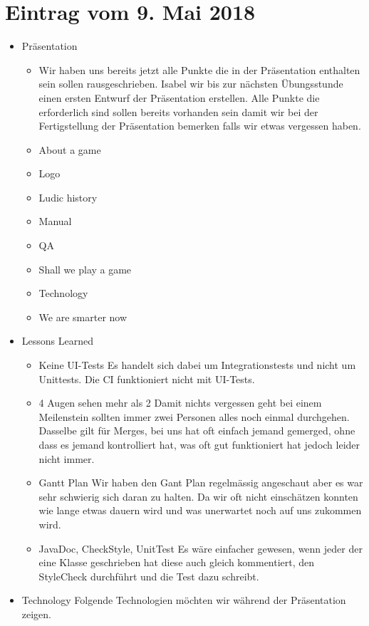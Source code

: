 \documentclass{scrartcl}
\newcommand{\n}{\newline}
\begin{document}
\section*{Eintrag vom 9. Mai 2018}
\begin{itemize}
	\item Präsentation 
	\begin{itemize}
		\item Wir haben uns bereits jetzt alle Punkte die in der Präsentation enthalten sein sollen rausgeschrieben. Isabel wir bis zur nächsten Übungsstunde einen ersten Entwurf der Präsentation erstellen. Alle Punkte die erforderlich sind sollen bereits vorhanden sein damit wir bei der Fertigstellung der Präsentation bemerken falls wir etwas vergessen haben. 
		\item About a game
		\item Logo
		\item Ludic history
		\item Manual
		\item QA
		\item Shall we play a game
		\item Technology
		\item We are smarter now
	\end{itemize}
	\item Lessons Learned
	\begin{itemize}
		\item Keine UI-Tests \n
		Es handelt sich dabei um Integrationstests und nicht um Unittests. Die CI funktioniert nicht mit UI-Tests.
		\item 4 Augen sehen mehr als 2 \n
		Damit nichts vergessen geht bei einem Meilenstein sollten immer zwei Personen alles noch einmal durchgehen. Dasselbe gilt für Merges, bei uns hat oft einfach jemand gemerged, ohne dass es jemand kontrolliert hat, was oft gut funktioniert hat jedoch leider nicht immer. 
		\item Gantt Plan \n
		Wir haben den Gant Plan regelmässig angeschaut aber es war sehr schwierig sich daran zu halten. Da wir oft nicht einschätzen konnten wie lange etwas dauern wird und was unerwartet noch auf uns zukommen wird.
		\item JavaDoc, CheckStyle, UnitTest \n
		Es wäre einfacher gewesen, wenn jeder der eine Klasse geschrieben hat diese auch gleich kommentiert, den StyleCheck durchführt und die Test dazu schreibt. 
	\end{itemize}
	\item Technology \n
	Folgende Technologien möchten wir während der Präsentation zeigen.

\end{itemize}
\end{document}
